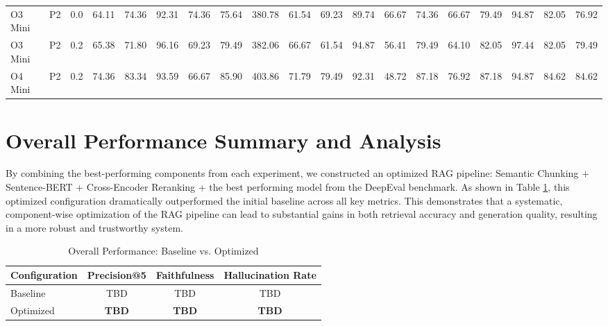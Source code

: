 \begin{landscape}
\begin{longtable}{|l|c|c|ccccc|c|ccccc|ccccc|}
        O3 Mini & P2 & 0.0 & 64.11 & 74.36 & 92.31 & 74.36 & 75.64 & 380.78 & 61.54 & 69.23 & 89.74 & 66.67 & 74.36 & 66.67 & 79.49 & 94.87 & 82.05 & 76.92 \\
        O3 Mini & P2 & 0.2 & 65.38 & 71.80 & 96.16 & 69.23 & 79.49 & 382.06 & 66.67 & 61.54 & 94.87 & 56.41 & 79.49 & 64.10 & 82.05 & 97.44 & 82.05 & 79.49 \\
        O4 Mini & P2 & 0.2 & 74.36 & 83.34 & 93.59 & 66.67 & 85.90 & 403.86 & 71.79 & 79.49 & 92.31 & 48.72 & 87.18 & 76.92 & 87.18 & 94.87 & 84.62 & 84.62 \\
    \end{longtable}
\end{landscape}



\section{Overall Performance Summary and Analysis}
\label{sec:overall_analysis}
By combining the best-performing components from each experiment, we constructed an optimized RAG pipeline: Semantic Chunking + Sentence-BERT + Cross-Encoder Reranking + the best performing model from the DeepEval benchmark. As shown in Table \ref{tab:overall_results}, this optimized configuration dramatically outperformed the initial baseline across all key metrics. This demonstrates that a systematic, component-wise optimization of the RAG pipeline can lead to substantial gains in both retrieval accuracy and generation quality, resulting in a more robust and trustworthy system.

\begin{table}[h!]
\centering
\caption{Overall Performance: Baseline vs. Optimized}
\label{tab:overall_results}
\begin{tabular}{|l|c|c|c|}
\hline
\textbf{Configuration} & \textbf{Precision@5} & \textbf{Faithfulness} & \textbf{Hallucination Rate} \\
\hline
Baseline & TBD & TBD & TBD \\
Optimized & \textbf{TBD} & \textbf{TBD} & \textbf{TBD} \\
\hline
\end{tabular}
\end{table}
